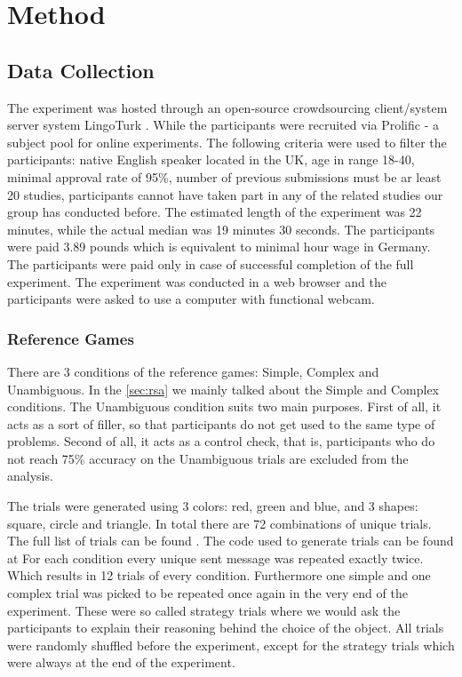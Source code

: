 ﻿\chapter{Method}

\section{Data Collection}
\label{sec:data}
The experiment was hosted through an open-source crowdsourcing client/system server system LingoTurk \cite{lingoturk}.
While the participants were recruited via Prolific \cite{prolific} - a subject pool for online experiments. The following criteria were used to filter the participants: native English speaker located in the UK, age in range 18-40, minimal approval rate of 95\%, number of previous submissions must be ar least 20 studies, participants cannot have taken part in any of the related studies our group has conducted before. The estimated length of the experiment was 22 minutes, while the actual median was 19 minutes 30 seconds. The participants were paid 3.89 pounds which is equivalent to minimal hour wage in Germany. The participants were paid only in case of successful completion of the full experiment. The experiment was conducted in a web browser and the participants were asked to use a computer with functional webcam. 


\subsection{Reference Games}
\label{sec:data:ref_games}
There are 3 conditions of the reference games: Simple, Complex and Unambiguous. In the \autoref{sec:rsa} we mainly talked about the Simple and Complex conditions. The Unambiguous condition suits two main purposes. First of all, it acts as a sort of filler, so that participants do not get used to the same type of problems. Second of all, it acts as a control check, that is, participants who do not reach 75\% accuracy on the Unambiguous trials are excluded from the analysis.

The trials were generated using 3 colors: red, green and blue, and 3 shapes: square, circle and triangle. In total there are 72 combinations of unique trials. The full list of trials can be found . The code used to generate trials can be found at  For each condition every unique sent message was repeated exactly twice. Which results in 12 trials of every condition. Furthermore one simple and one complex trial was picked to be repeated once again in the very end of the experiment. These were so called strategy trials where we would ask the participants to explain their reasoning behind the choice of the object. All trials were randomly shuffled before the experiment, except for the strategy trials which were always at the end of the experiment.

